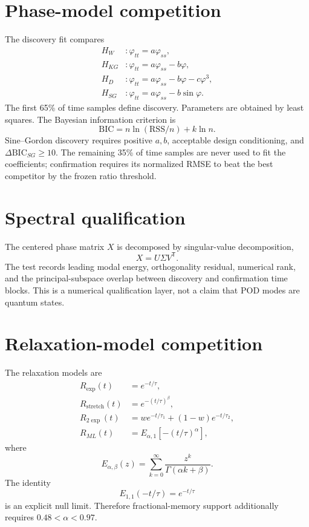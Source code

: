 \documentclass[11pt]{article}
\begin{document}
\section{Phase-model competition}
The discovery fit compares
\begin{align}
H_W &: \varphi_{tt}=a\varphi_{ss},\\
H_{KG} &: \varphi_{tt}=a\varphi_{ss}-b\varphi,\\
H_D &: \varphi_{tt}=a\varphi_{ss}-b\varphi-c\varphi^3,\\
H_{SG} &: \varphi_{tt}=a\varphi_{ss}-b\sin\varphi.
\end{align}
The first 65\% of time samples define discovery.  Parameters are obtained by least squares.  The Bayesian information criterion is
\begin{equation}
\mathrm{BIC}=n\ln(\mathrm{RSS}/n)+k\ln n.
\end{equation}
Sine--Gordon discovery requires positive $a,b$, acceptable design conditioning, and $\Delta\mathrm{BIC}_{SG}\ge10$.  The remaining 35\% of time samples are never used to fit the coefficients; confirmation requires its normalized RMSE to beat the best competitor by the frozen ratio threshold.

\section{Spectral qualification}
The centered phase matrix $X$ is decomposed by singular-value decomposition,
\begin{equation}
X=U\Sigma V^{\mathsf T}.
\end{equation}
The test records leading modal energy, orthogonality residual, numerical rank, and the principal-subspace overlap between discovery and confirmation time blocks.  This is a numerical qualification layer, not a claim that POD modes are quantum states.

\section{Relaxation-model competition}
The relaxation models are
\begin{align}
R_{\exp}(t)&=e^{-t/\tau},\\
R_{\mathrm{stretch}}(t)&=e^{-(t/\tau)^\beta},\\
R_{2\exp}(t)&=w e^{-t/\tau_1}+(1-w)e^{-t/\tau_2},\\
R_{ML}(t)&=E_{\alpha,1}\!\left[-(t/\tau)^\alpha\right],
\end{align}
where
\begin{equation}
E_{\alpha,\beta}(z)=\sum_{k=0}^{\infty}\frac{z^k}{\Gamma(\alpha k+\beta)}.
\end{equation}
The identity
\begin{equation}
E_{1,1}(-t/\tau)=e^{-t/\tau}
\end{equation}
is an explicit null limit.  Therefore fractional-memory support additionally requires $0.48<\alpha<0.97$.
\end{document}
